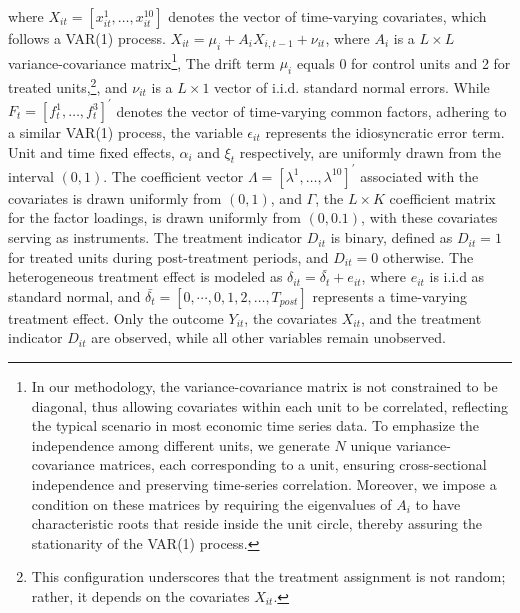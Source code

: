 \documentclass[12pt]{article}
\begin{document}
\noindent where $X_{it} = [x_{it}^1, \ldots, x_{it}^{10}]$ denotes the vector of time-varying covariates, which follows a VAR(1) process. $X_{it} = \mu_i + A_i X_{i,t-1} + \nu_{it}$, where $A_i$ is a $ L \times L$ variance-covariance matrix\footnote{In our methodology, the variance-covariance matrix is not constrained to be diagonal, thus allowing covariates within each unit to be correlated, reflecting the typical scenario in most economic time series data. To emphasize the independence among different units, we generate $N$ unique variance-covariance matrices, each corresponding to a unit, ensuring cross-sectional independence and preserving time-series correlation. Moreover, we impose a condition on these matrices by requiring the eigenvalues of $A_i$ to have characteristic roots that reside inside the unit circle, thereby assuring the stationarity of the VAR(1) process.}, The drift term $\mu_i$ equals 0 for control units and 2 for treated units,\footnote{This configuration underscores that the treatment assignment is not random; rather, it depends on the covariates $X_{it}$.}, and $\nu_{it}$ is a $L \times 1$ vector of i.i.d. standard normal errors. While $F_t = [f_t^1, \ldots, f_t^3]^\prime$ denotes the vector of time-varying common factors, adhering to a similar VAR(1) process, the variable $\epsilon_{it}$ represents the idiosyncratic error term. Unit and time fixed effects, $\alpha_i$ and $\xi_{t}$ respectively, are uniformly drawn from the interval $(0,1)$. The coefficient vector $\Lambda = [\lambda^1, \ldots, \lambda^{10}]^\prime$ associated with the covariates is drawn uniformly from $(0,1)$, and $\Gamma$, the $L \times K$ coefficient matrix for the factor loadings, is drawn uniformly from $(0,0.1)$, with these covariates serving as instruments. The treatment indicator $D_{it}$ is binary, defined as $D_{it} = 1$ for treated units during post-treatment periods, and $D_{it} = 0$ otherwise. The heterogeneous treatment effect is modeled as $\delta_{it} = \bar{\delta_t} + e_{it}$, where $e_{it}$ is i.i.d as standard normal, and $\bar{\delta_t} = [0, \cdots, 0, 1,2,\ldots,T_{post}]$ represents a time-varying treatment effect. Only the outcome $Y_{it}$, the covariates $X_{it}$, and the treatment indicator $D_{it}$ are observed, while all other variables remain unobserved.
\end{document}
